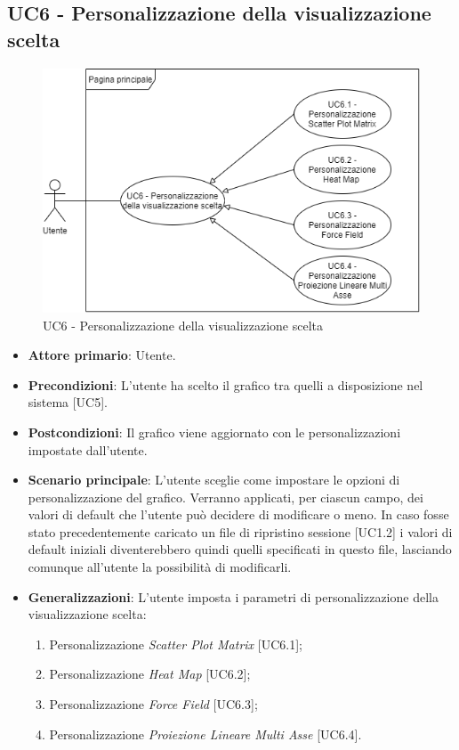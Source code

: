 \subsection{UC6 - Personalizzazione della visualizzazione scelta}
\begin{figure}[h]
\includegraphics[width=\linewidth]{Section/Images/UC6.png}
\centering
\caption{UC6 - Personalizzazione della visualizzazione scelta}
\end{figure}
\begin{itemize}
	\item \textbf{Attore primario}: Utente.
	
	\item \textbf{Precondizioni}: L'utente ha scelto il grafico tra quelli a disposizione nel sistema [UC5].
	
	\item \textbf{Postcondizioni}: Il grafico viene aggiornato con le personalizzazioni impostate dall'utente.
	
	\item \textbf{Scenario principale}: L’utente sceglie come impostare le opzioni di personalizzazione del grafico. Verranno applicati, per ciascun campo, dei valori di default che l'utente può decidere di modificare o meno. In caso fosse stato precedentemente caricato un file di ripristino sessione [UC1.2] i valori di default iniziali diventerebbero quindi quelli specificati in questo file, lasciando comunque all'utente la possibilità di modificarli.
	
	\item \textbf{Generalizzazioni}: L'utente imposta i parametri di personalizzazione della visualizzazione scelta:
	\begin{enumerate}
	\item Personalizzazione \textit{Scatter Plot Matrix} [UC6.1];
	\item Personalizzazione \textit{Heat Map} [UC6.2];
	\item Personalizzazione \textit{Force Field} [UC6.3];
	\item Personalizzazione \textit{Proiezione Lineare Multi Asse} [UC6.4].
	\end{enumerate}
		
\end{itemize}


